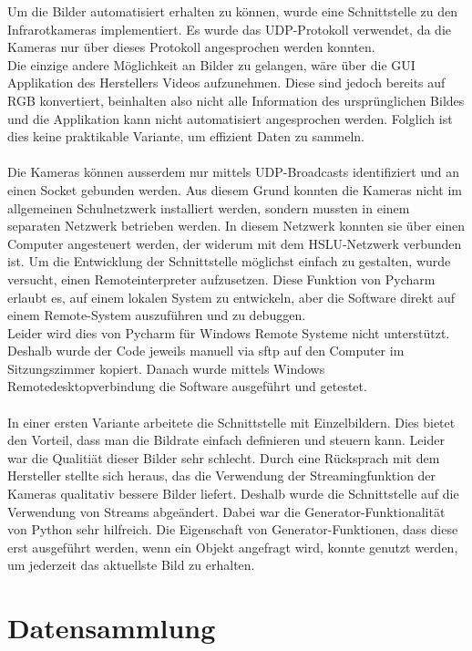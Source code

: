 Um die Bilder automatisiert erhalten zu können, wurde eine Schnittstelle zu den Infrarotkameras implementiert. Es wurde das UDP-Protokoll verwendet, da die Kameras nur über dieses Protokoll angesprochen werden konnten.\\
Die einzige andere Möglichkeit an Bilder zu gelangen, wäre über die GUI Applikation des Herstellers Videos aufzunehmen. Diese sind jedoch bereits auf RGB konvertiert, beinhalten also nicht alle Information des ursprünglichen Bildes und die Applikation kann nicht automatisiert angesprochen werden. Folglich ist dies keine praktikable Variante, um effizient Daten zu sammeln.\\
\\
Die Kameras können ausserdem nur mittels UDP-Broadcasts identifiziert und an einen Socket gebunden werden. Aus diesem Grund konnten die Kameras nicht im allgemeinen Schulnetzwerk installiert werden, sondern mussten in einem separaten Netzwerk betrieben werden. In diesem Netzwerk konnten sie über einen Computer angesteuert werden, der widerum mit dem HSLU-Netzwerk verbunden ist. Um die Entwicklung der Schnittstelle möglichst einfach zu gestalten, wurde versucht, einen Remoteinterpreter aufzusetzen. Diese Funktion von Pycharm \parencite{pycharm} erlaubt es, auf einem lokalen System zu entwickeln, aber die Software direkt auf einem Remote-System auszuführen und zu debuggen.\\
Leider wird dies von Pycharm für Windows Remote Systeme nicht unterstützt. Deshalb wurde der Code jeweils manuell via sftp auf den Computer im Sitzungszimmer kopiert. Danach wurde mittels Windows Remotedesktopverbindung die Software ausgeführt und getestet. \\
\\
In einer ersten Variante arbeitete die Schnittstelle mit Einzelbildern. Dies bietet den Vorteil, dass man die Bildrate einfach definieren und steuern kann. Leider war die Qualitiät dieser Bilder sehr schlecht. Durch eine Rücksprach mit dem Hersteller stellte sich heraus, das die Verwendung der Streamingfunktion der Kameras qualitativ bessere Bilder liefert. Deshalb wurde die Schnittstelle auf die Verwendung von Streams abgeändert. Dabei war die Generator-Funktionalität von Python sehr hilfreich. Die Eigenschaft von Generator-Funktionen, dass diese erst ausgeführt werden, wenn ein Objekt angefragt wird, konnte genutzt werden, um jederzeit das aktuellste Bild zu erhalten.

\section{Datensammlung}

